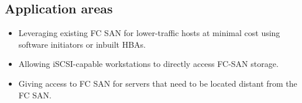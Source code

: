 
\subsection{Application areas}
\label{sec:application-areas}

\begin{itemize}
\item
  Leveraging existing FC SAN for lower-traffic hosts at minimal cost
  using software initiators or inbuilt HBAs.
\item
  Allowing iSCSI-capable workstations to directly access FC-SAN storage.
\item
  Giving access to FC SAN for servers that need to be located distant
  from the FC SAN.
\end{itemize}

